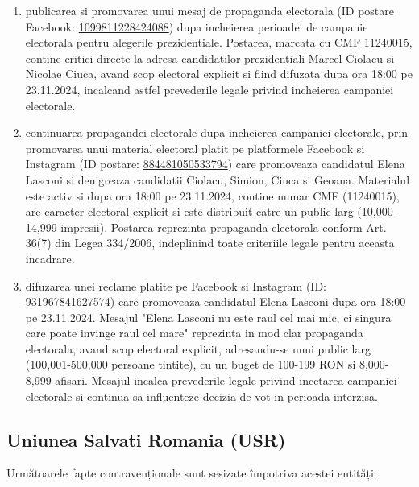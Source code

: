 \documentclass[a4paper,12pt]{article}
\begin{document}
\begin{enumerate}[leftmargin=*, label=\arabic*.)]
    \item publicarea si promovarea unui mesaj de propaganda electorala (ID postare Facebook: \href{https://www.facebook.com/ads/library/?id=1099811228424088}{1099811228424088}) dupa incheierea perioadei de campanie electorala pentru alegerile prezidentiale. Postarea, marcata cu CMF 11240015, contine critici directe la adresa candidatilor prezidentiali Marcel Ciolacu si Nicolae Ciuca, avand scop electoral explicit si fiind difuzata dupa ora 18:00 pe 23.11.2024, incalcand astfel prevederile legale privind incheierea campaniei electorale.
    \item continuarea propagandei electorale dupa incheierea campaniei electorale, prin promovarea unui material electoral platit pe platformele Facebook si Instagram (ID postare: \href{https://www.facebook.com/ads/library/?id=884481050533794}{884481050533794}) care promoveaza candidatul Elena Lasconi si denigreaza candidatii Ciolacu, Simion, Ciuca si Geoana. Materialul este activ si dupa ora 18:00 pe 23.11.2024, contine numar CMF (11240015), are caracter electoral explicit si este distribuit catre un public larg (10,000-14,999 impresii). Postarea reprezinta propaganda electorala conform Art. 36(7) din Legea 334/2006, indeplinind toate criteriile legale pentru aceasta incadrare.
    \item difuzarea unei reclame platite pe Facebook si Instagram (ID: \href{https://www.facebook.com/ads/library/?id=931967841627574}{931967841627574}) care promoveaza candidatul Elena Lasconi dupa ora 18:00 pe 23.11.2024. Mesajul "Elena Lasconi nu este raul cel mai mic, ci singura care poate invinge raul cel mare" reprezinta in mod clar propaganda electorala, avand scop electoral explicit, adresandu-se unui public larg (100,001-500,000 persoane tintite), cu un buget de 100-199 RON si 8,000-8,999 afisari. Mesajul incalca prevederile legale privind incetarea campaniei electorale si continua sa influenteze decizia de vot in perioada interzisa.
\end{enumerate}

\vspace{0.5cm}

\subsection{Uniunea Salvati Romania (USR)}
Următoarele fapte contravenționale sunt sesizate împotriva acestei entități:
\end{document}
